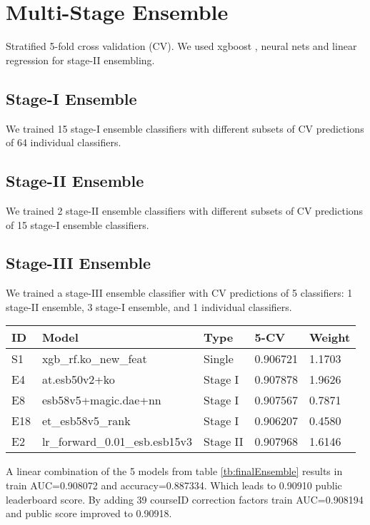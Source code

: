 \section{Multi-Stage Ensemble}
Stratified 5-fold cross validation (CV).
We used xgboost \cite{xgboost}, neural nets and linear regression for stage-II ensembling.

\subsection{Stage-I Ensemble}
We trained 15 stage-I ensemble classifiers with different subsets of CV predictions of 64 individual classifiers.

\subsection{Stage-II Ensemble}
We trained 2 stage-II ensemble classifiers with different subsets of CV predictions of 15 stage-I ensemble classifiers.

\subsection{Stage-III Ensemble}
We trained a stage-III ensemble classifier with CV predictions of 5 classifiers: 1 stage-II ensemble, 3 stage-I ensemble, and 1 individual classifiers.
\\

\begin{center}
\begin{tabular}{lllll}
\label{tb:finalEnsemble}
ID 	& Model 				& Type 	& 5-CV 		& Weight\\ \hline
S1 	& xgb\_rf.ko\_new\_feat 	& Single 	& 0.906721 	& 1.1703 \\
E4 	& at.esb50v2+ko 		& Stage I 	& 0.907878 	& 1.9626\\
E8 	& esb58v5+magic.dae+nn & Stage I & 0.907567	& 0.7871\\
E18	& et\_esb58v5\_rank		& Stage I	& 0.906207 	& 0.4580\\
E2	& lr\_forward\_0.01\_esb.esb15v3 & Stage II & 0.907968 & 1.6146\\
\end{tabular}
\end{center}

A linear combination of the 5 models from table \ref{tb:finalEnsemble} results in train AUC=0.908072 and accuracy=0.887334.
Which leads to 0.90910 public leaderboard score.
By adding 39 courseID correction factors train AUC=0.908194 and public score improved to 0.90918.

